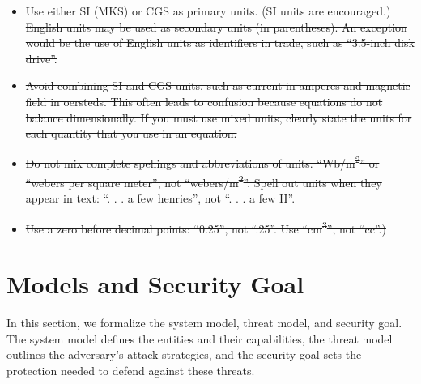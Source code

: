 ﻿\documentclass[conference]{IEEEtran}
\providecommand{\DIFdeltex}[1]{{\protect\color{red}\sout{#1}}}                      %
\providecommand{\DIFdelbegin}{} %
\providecommand{\DIFdelend}{} %
\providecommand{\DIFdel}[1]{\texorpdfstring{\DIFdeltex{#1}}{}} %
\newcommand{\DIFscaledelfig}{0.5}
\newlength{\DIFdelgraphicswidth} %
\newlength{\DIFdelgraphicsheight} %
\newcommand{\DIFdelincludegraphics}[2][]{%
\sbox{\DIFdelgraphicsbox}{\DIFOincludegraphics[#1]{#2}}%
\settoboxwidth{\DIFdelgraphicswidth}{\DIFdelgraphicsbox} %
\settoboxtotalheight{\DIFdelgraphicsheight}{\DIFdelgraphicsbox} %
\scalebox{\DIFscaledelfig}{%
\parbox[b]{\DIFdelgraphicswidth}{\usebox{\DIFdelgraphicsbox}\\[-\baselineskip] \rule{\DIFdelgraphicswidth}{0em}}\llap{\resizebox{\DIFdelgraphicswidth}{\DIFdelgraphicsheight}{%
\setlength{\unitlength}{\DIFdelgraphicswidth}%
\begin{picture}(1,1)%
\thicklines\linethickness{2pt} %
{\color[rgb]{1,0,0}\put(0,0){\framebox(1,1){}}}%
{\color[rgb]{1,0,0}\put(0,0){\line( 1,1){1}}}%
{\color[rgb]{1,0,0}\put(0,1){\line(1,-1){1}}}%
\end{picture}%
}\hspace*{3pt}}} %
} %
\DeclareRobustCommand{\DIFdelbegin}{\DIFOdelbegin \let\includegraphics\DIFdelincludegraphics} %
\DeclareRobustCommand{\DIFdelend}{\DIFOaddend \let\includegraphics\DIFOincludegraphics} %
\begin{document}
\DIFdelbegin %
\begin{itemize}%
\item%
\DIFdel{Use either SI (MKS) or CGS as primary units. (SI units are encouraged.) English units may be used as secondary units (in parentheses). An exception would be the use of English units as identifiers in trade, such as ``3.5-inch disk drive''.
}%
\item%
\DIFdel{Avoid combining SI and CGS units, such as current in amperes and magnetic field in oersteds. This often leads to confusion because equations do not balance dimensionally. If you must use mixed units, clearly state the units for each quantity that you use in an equation.
}%
\item%
\DIFdel{Do not mix complete spellings and abbreviations of units: ``Wb/m\textsuperscript{2}'' or ``webers per square meter'', not ``webers/m\textsuperscript{2}''. Spell out units when they appear in text: ``. . . a few henries'', not ``. . . a few H''.
}%
\item%
\DIFdel{Use a zero before decimal points: ``0.25'', not ``.25''. Use ``cm\textsuperscript{3}'', not ``cc''.)
}
\end{itemize}%

\DIFdelend \section{Models and Security Goal}
In this section, we formalize the system model, threat model, and security goal. The system model defines the entities and their capabilities, the threat model outlines the adversary's attack strategies, and the security goal sets the protection needed to defend against these threats.
\end{document}
